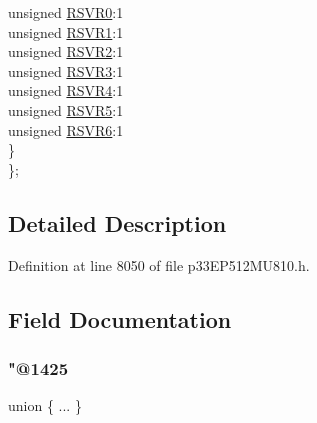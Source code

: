 \begin{DoxyCompactItemize}
\begin{tabbing}
\>\>unsigned \hyperlink{structtag_r_p_i_n_r2_b_i_t_s_aadb7f5f2c47af4a8d8e1c880fcd3e623}{RSVR0}:1\\
\>\>unsigned \hyperlink{structtag_r_p_i_n_r2_b_i_t_s_a8cb27628ee578d7ced0c80cd5de83892}{RSVR1}:1\\
\>\>unsigned \hyperlink{structtag_r_p_i_n_r2_b_i_t_s_a063cc14654905d0001db67072c73fd8f}{RSVR2}:1\\
\>\>unsigned \hyperlink{structtag_r_p_i_n_r2_b_i_t_s_a83f36be22f8df9fc0acb924220e90839}{RSVR3}:1\\
\>\>unsigned \hyperlink{structtag_r_p_i_n_r2_b_i_t_s_a2b5af1c9b5adec4eca2250bea348c520}{RSVR4}:1\\
\>\>unsigned \hyperlink{structtag_r_p_i_n_r2_b_i_t_s_a10573537fd129782ea47fbddd9cf1533}{RSVR5}:1\\
\>\>unsigned \hyperlink{structtag_r_p_i_n_r2_b_i_t_s_acac217201849a2539cf5c0d3395ffd98}{RSVR6}:1\\
\>\} \\
\}; \\

\end{tabbing}\end{DoxyCompactItemize}


\subsection{Detailed Description}


Definition at line 8050 of file p33\+E\+P512\+M\+U810.\+h.



\subsection{Field Documentation}
\mbox{\label{structtag_r_p_i_n_r2_b_i_t_s_a7bb8a6ed4a1b4a09f0d17d3a1af20034}} 
\subsubsection{\texorpdfstring{"@1425}{@1425}}
{\footnotesize\ttfamily union \{ ... \} }

\mbox{\label{structtag_r_p_i_n_r2_b_i_t_s_adf71f3d8410c1f1dbbc96680a92c49af}} 
